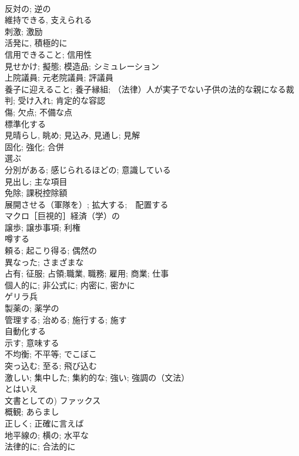 \documentclass[8pt]{extreport}
\begin{document}
\begin{CJK}{UTF8}{min}
\\	反対の; 逆の	
\\	維持できる, 支えられる	
\\	刺激; 激励	
\\	活発に, 積極的に	
\\	信用できること; 信用性	
\\	見せかけ; 擬態; 模造品; シミュレーション	
\\	上院議員; 元老院議員; 評議員	
\\	養子に迎えること; 養子縁組; （法律）人が実子でない子供の法的な親になる裁判; 受け入れ; 肯定的な容認	
\\	傷; 欠点; 不備な点	
\\	標準化する	
\\	見晴らし, 眺め; 見込み, 見通し; 見解	
\\	固化; 強化; 合併	
\\	選ぶ	
\\	分別がある; 感じられるほどの; 意識している	
\\	見出し; 主な項目	
\\	免除; 課税控除額	
\\	展開させる（軍隊を）; 拡大する;　配置する	
\\	マクロ［巨視的］経済（学）の	
\\	譲歩; 譲歩事項; 利権	
\\	噂する	
\\	頼る; 起こり得る; 偶然の	
\\	異なった; さまざまな	
\\	占有; 征服; 占領;職業, 職務; 雇用; 商業; 仕事	
\\	個人的に; 非公式に; 内密に, 密かに	
\\	ゲリラ兵	
\\	製薬の; 薬学の	
\\	管理する; 治める; 施行する; 施す	
\\	自動化する	
\\	示す; 意味する	
\\	不均衡; 不平等; でこぼこ	
\\	突っ込む; 至る; 飛び込む	
\\	激しい; 集中した; 集約的な; 強い; 強調の（文法）	
\\	とはいえ	
\\	文書としての) ファックス	
\\	概観; あらまし	
\\	正しく; 正確に言えば	
\\	地平線の; 横の; 水平な	
\\	法律的に; 合法的に	

\end{CJK}
\end{document}
